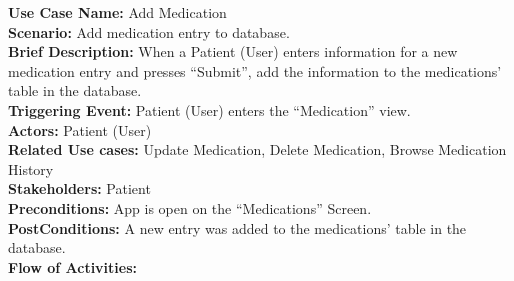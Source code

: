 \documentclass[11pt]{article}
\begin{document}
    \textbf{Use Case Name:} Add Medication\\
    \textbf{Scenario:} Add medication entry to database.\\
    \textbf{Brief Description:} When a Patient (User) enters information for a new medication entry and presses ``Submit'', add the information to the medications' table in the database.\\
    \textbf{Triggering Event:} Patient (User) enters the ``Medication'' view.\\
    \textbf{Actors:} Patient (User)\\
    \textbf{Related Use cases:} Update Medication, Delete Medication, Browse Medication History\\
    \textbf{Stakeholders:} Patient\\
    \textbf{Preconditions:} App is open on the ``Medications'' Screen.\\
    \textbf{PostConditions:} A new entry was added to the medications' table in the database.\\
    \textbf{Flow of Activities:}
\end{document}
